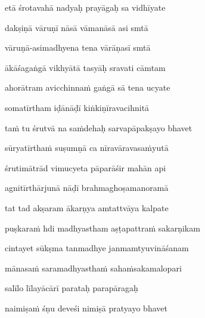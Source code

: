 etā śrotavahā nadyaḥ prayāgaḥ sa vidhīyate \veg\dontdisplaylinenum

dakṣiṇā vāruṇī nāsā vāmanāsā asi smtā\thinspace{\dandab} \dontdisplaylinenum

vāruṇā-asimadhyena tena vārāṇasī smtā \veg\dontdisplaylinenum

ākāśagaṅgā vikhyātā tasyāḥ sravati cāmtam\thinspace{\dandab} \dontdisplaylinenum

ahorātram avicchinna\.m gaṅgā sā tena ucyate \veg\dontdisplaylinenum

somatīrtham iḍānāḍī kiṅkiṇīravacihnitā\thinspace{\dandab} \dontdisplaylinenum

ta\.m tu śrutvā na sa\.mdehaḥ sarvapāpakṣayo bhavet \veg\dontdisplaylinenum

sūryatīrtha\.m suṣumṇā ca nīravāravasa\.myutā\thinspace{\dandab} \dontdisplaylinenum

śrutimātrād vimucyeta pāparāśir mahān api \veg\dontdisplaylinenum

agnitīrthārjunā nāḍī brahmaghoṣamanoramā\thinspace{\dandab} \dontdisplaylinenum

tat tad akṣaram ākarṇya amtattvāya kalpate \veg\dontdisplaylinenum

puṣkara\.m hdi madhyastham aṣṭapattra\.m sakarṇikam\thinspace{\dandab} \dontdisplaylinenum

cintayet sūkṣma tanmadhye janmamtyuvināśanam \veg\dontdisplaylinenum

mānasa\.m saramadhyastha\.m saha\.msakamalopari\thinspace{\dandab} \dontdisplaylinenum

salīlo līlayācārī parataḥ parapāragaḥ \veg\dontdisplaylinenum

naimiṣa\.m śṇu deveśi nimiṣā pratyayo bhavet\thinspace{\dandab} \dontdisplaylinenum


